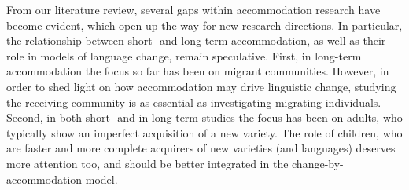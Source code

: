 \documentclass[output=paper,
modfonts
]{langscibook}
\begin{document}
From our literature review, several gaps within accommodation research have become evident, which open up the way for new research directions. In particular, the relationship between short- and long-term accommodation, as well as their role in models of language change, remain speculative. First, in long-term accommodation the focus so far has been on migrant communities. However, in order to shed light on how accommodation may drive linguistic change, studying the receiving community is as essential as investigating migrating individuals. Second, in both short- and in long-term studies the focus has been on adults, who typically show an imperfect acquisition of a new variety. The role of children, who are faster and more complete acquirers of new varieties (and languages) deserves more attention too, and should be better integrated in the change-by-accommodation model. %
% 
% 
% 
%  
% 
% 
% 
% 
\end{document}
